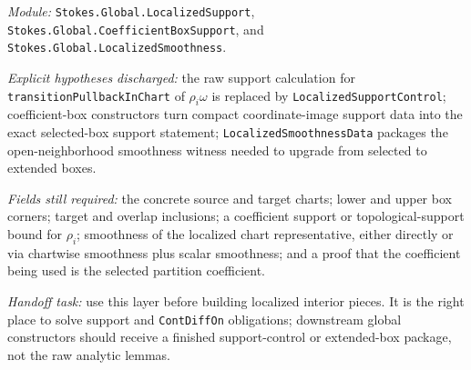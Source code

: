 \begin{definition}
  \label{anc:m6_localized_support_smoothness}
  \leanok
  \emph{Module:} \texttt{Stokes.Global.LocalizedSupport},
  \texttt{Stokes.Global.CoefficientBoxSupport}, and
  \texttt{Stokes.Global.LocalizedSmoothness}.

  \emph{Explicit hypotheses discharged:}
  the raw support calculation for
  \texttt{transitionPullbackInChart} of \(\rho_i \omega\) is replaced by
  \texttt{LocalizedSupportControl}; coefficient-box constructors turn compact
  coordinate-image support data into the exact selected-box support statement;
  \texttt{LocalizedSmoothnessData} packages the open-neighborhood smoothness
  witness needed to upgrade from selected to extended boxes.

  \emph{Fields still required:}
  the concrete source and target charts; lower and upper box corners;
  target and overlap inclusions; a coefficient support or topological-support
  bound for \(\rho_i\); smoothness of the localized chart representative, either
  directly or via chartwise smoothness plus scalar smoothness; and a proof that
  the coefficient being used is the selected partition coefficient.

  \emph{Handoff task:}
  use this layer before building localized interior pieces.  It is the right
  place to solve support and \texttt{ContDiffOn} obligations; downstream
  global constructors should receive a finished support-control or
  extended-box package, not the raw analytic lemmas.
\end{definition}

